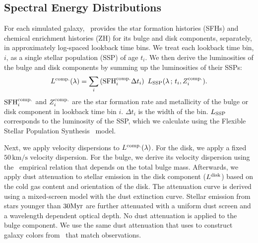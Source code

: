 
\subsection{Spectral Energy Distributions} \label{sec:sed}
For each simulated galaxy, \lgal~provides the star formation histories (SFHs)
and chemical enrichment histories (ZH) for its bulge and disk components,
separately, in approximately log-spaced lookback time bins.  
We treat each lookback time bin, $i$, as a single stellar population (SSP) of
age $t_i$.
We then derive the luminosities of the bulge and disk components by summing up
the luminosities of their SSPs:
\begin{equation}
    L^{\rm comp.}(\lambda) = \sum \limits_i \left({\rm SFH}^{\rm comp.}_i
    \Delta t_i\right)~L_{\rm SSP}(\lambda\,;\, t_i, Z^{\rm comp.}_i). 
\end{equation}
${\rm SFH}^{\rm comp.}_i$ and $Z^{\rm comp.}_i$ are the star formation rate and
metallicity of the bulge or disk component in lookback time bin $i$. 
$\Delta t_i$ is the width of the bin. 
$L_{\rm SSP}$ corresponds to the luminosity of the SSP, which we calculate
using the Flexible Stellar Population Synthesis~\citep[\fsps;][]{conroy2009,
conroy2010c} model.

Next, we apply velocity dispersions to $L^{\rm comp.}(\lambda)$.
For the disk, we apply a fixed $50\,\mathrm{km/s}$ velocity dispersion. 
For the bulge, we derive its velocity dispersion using the~\cite{zahid2016}
empirical relation that depends on the total bulge mass.
Afterwards, we apply dust attenuation to stellar emission in the disk component
($L^{\rm disk}$) based on the cold gas content and orientation of the disk. 
The attenuation curve is derived using a mixed-screen model with the
\cite{mathis1983} dust extinction curve. 
Stellar emission from stars younger than $30{\rm Myr}$ are further attenuated
with a uniform dust screen and a wavelength dependent optical depth.
No dust attenuation is applied to the bulge component.
We use the same dust attenuation that \cite{henriques2015} uses to construct
galaxy colors from \lgal~that match observations. 

